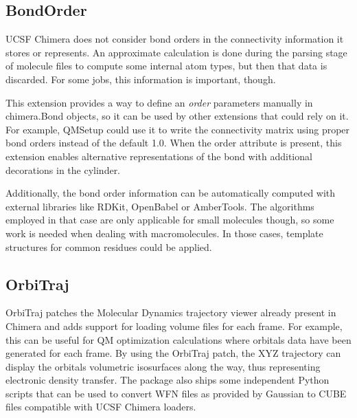 \subsection{BondOrder}
UCSF Chimera does not consider bond orders in the connectivity information it stores or represents. An approximate calculation is done during the parsing stage of molecule files to compute some internal atom types, but then that data is discarded. For some jobs, this information is important, though.

This extension provides a way to define an \textit{order} parameters manually in chimera.Bond objects, so it can be used by other extensions that could rely on it. For example, QMSetup could use it to write the connectivity matrix using proper bond orders instead of the default 1.0. When the order attribute is present, this extension enables alternative representations of the bond with additional decorations in the cylinder.

Additionally, the bond order information can be automatically computed with external libraries like RDKit, OpenBabel or AmberTools. The algorithms employed in that case are only applicable for small molecules though, so some work is needed when dealing with macromolecules. In those cases, template structures for common residues could be applied.

\subsection{OrbiTraj}
OrbiTraj patches the Molecular Dynamics trajectory viewer already present in Chimera and adds support for loading volume files for each frame. For example, this can be useful for QM optimization calculations where orbitals data have been generated for each frame. By using the OrbiTraj patch, the XYZ trajectory can display the orbitals volumetric isosurfaces along the way, thus representing electronic density transfer. The package also ships some independent Python scripts that can be used to convert WFN files as provided by Gaussian to CUBE files compatible with UCSF Chimera loaders.


